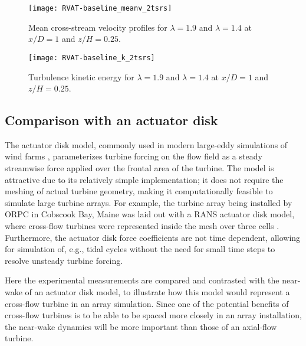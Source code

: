 \begin{figure}
    \centering

    \texttt{[image: RVAT-baseline\_meanv\_2tsrs]}

    \caption{Mean cross-stream velocity profiles for $\lambda = 1.9$ and
        $\lambda=1.4$ at $x/D=1$ and $z/H = 0.25$.}

    \label{fig:RVAT-baseline-meanv-2tsrs}
\end{figure}

\begin{figure}
    \centering

    \texttt{[image: RVAT-baseline\_k\_2tsrs]}

    \caption{Turbulence kinetic energy for $\lambda = 1.9$ and
        $\lambda=1.4$ at $x/D=1$ and $z/H = 0.25$.}

    \label{fig:RVAT-baseline-k-2tsrs}
\end{figure}


\subsection{Comparison with an actuator disk}

The actuator disk model, commonly used in modern large-eddy simulations of wind
farms \cite{Stevens2014}, parameterizes turbine forcing on the flow field as a
steady streamwise force applied over the frontal area of the turbine. The model
is attractive due to its relatively simple implementation; it does not require
the meshing of actual turbine geometry, making it computationally feasible to
simulate large turbine arrays. For example, the turbine array being installed by
ORPC in Cobscook Bay, Maine was laid out with a RANS actuator disk model, where
cross-flow turbines were represented inside the mesh over three cells
\cite{Nelson2013}. Furthermore, the actuator disk force coefficients are not
time dependent, allowing for simulation of, e.g., tidal cycles without the need
for small time steps to resolve unsteady turbine forcing.

Here the experimental measurements are compared and contrasted with the
near-wake of an actuator disk model, to illustrate how this model would
represent a cross-flow turbine in an array simulation. Since one of the
potential benefits of cross-flow turbines is to be able to be spaced more
closely in an array installation, the near-wake dynamics will be more important
than those of an axial-flow turbine.

